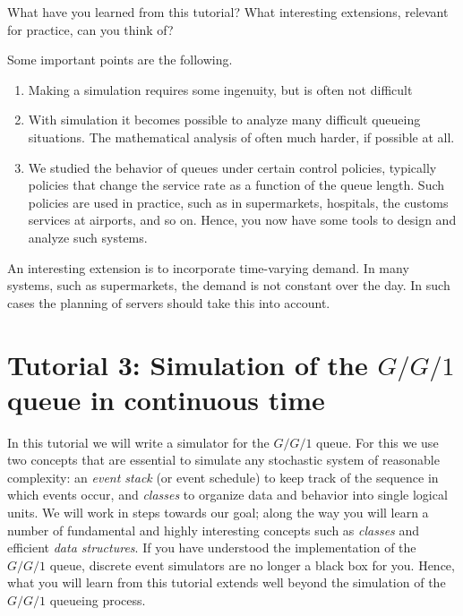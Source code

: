 \begin{exercise}
  What have you learned from this tutorial? What interesting extensions, relevant for practice,  can you think of?
  \begin{solution}
    Some important points are the following.
    \begin{enumerate}
    \item  Making a  simulation requires some ingenuity, but is often not difficult
    \item With simulation it becomes possible to analyze many difficult queueing situations. The mathematical analysis of often much harder, if possible at all.
    \item We studied the behavior of queues under certain control policies, typically policies that change the service rate as a function of the queue length. Such policies are used in practice, such as in supermarkets, hospitals, the customs services at airports, and so on. Hence, you now have some tools to design and analyze such systems. 
    \end{enumerate}

An interesting extension is to incorporate time-varying demand. In many systems, such as supermarkets, the demand is not constant over the day. In such cases the planning of servers should take this into account. 

  \end{solution}
\end{exercise}

\clearpage

\section{Tutorial 3: Simulation of the $G/G/1$ queue in continuous time}
\label{sec:simulation-gg1-queue}

In this tutorial we will write a simulator for the $G/G/1$ queue.
For this we use two concepts that are essential to simulate any stochastic system of reasonable complexity: an \emph{event stack} (or event schedule) to keep track of the sequence in which events occur, and \emph{classes} to organize data and behavior into single logical units.
We will work in steps towards our goal; along the way you will learn a number of fundamental and highly interesting concepts such as \emph{classes} and efficient \emph{data structures}.
If you have understood the implementation of the $G/G/1$ queue, discrete event simulators are no longer a black box for you.
Hence, what you will learn from this tutorial extends well beyond the simulation of the $G/G/1$ queueing process.

